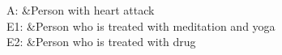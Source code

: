 A:	&Person with heart attack\\
E1:	&Person who is treated with meditation and yoga\\
E2:	&Person who is treated with drug\\
